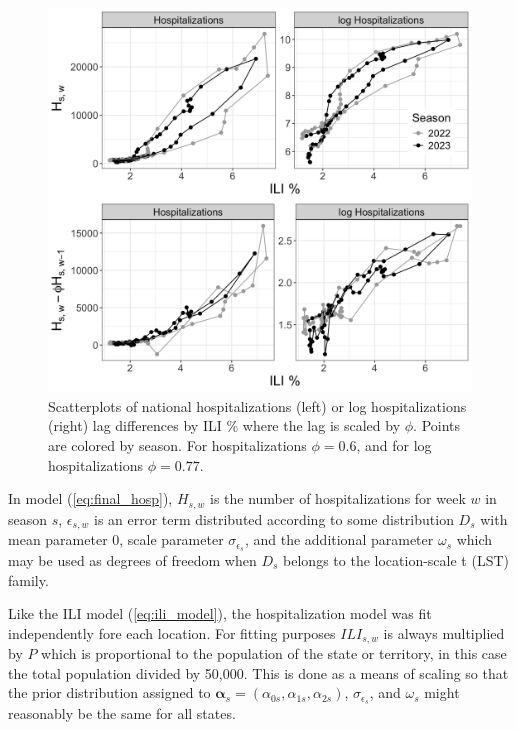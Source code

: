\begin{figure}[hbt!]
    \includegraphics[scale=.2]{Images/ili_v_svat_vs_lagdiff.png}
    \caption{Scatterplots of national hospitalizations (left) or log 
    hospitalizations (right) lag differences by ILI \% where the lag is 
    scaled by $\phi$. Points are colored by season. For hospitalizations 
    $\phi = 0.6$, and for log hospitalizations $\phi = 0.77$. }
    \label{fig:lag_scatter}
\end{figure}



In model (\ref{eq:final_hosp}), $H_{s,w}$ is the number of hospitalizations for 
week $w$ in season $s$, $\epsilon_{s,w}$ is an error term distributed 
according to some distribution $D_s$ with mean parameter 0, scale parameter 
$\sigma_{\epsilon_s}$, and the additional parameter $\omega_s$ which 
may be used as degrees of freedom
when $D_s$ belongs to the location-scale t (LST) family.  



Like the ILI model (\ref{eq:ili_model}), 
the hospitalization model was fit independently fore each location.
For fitting purposes $ILI_{s,w}$ is always 
multiplied by $P$ which is proportional to the population of the state or 
territory, in this case the total population divided by 50,000. This is done 
as a means of scaling so that the prior distribution assigned to  
$\boldsymbol{\alpha}_s = (\alpha_{0s}, \alpha_{1s}, \alpha_{2s})$, 
$\sigma_{\epsilon_s}$, and $\omega_s$ might reasonably be the same for all 
states.


